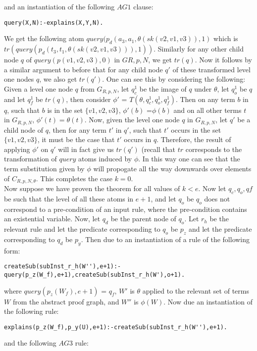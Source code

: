 \documentclass{article}
\begin{document}
and an instantiation of the following $AG1$ clause:
\begin{verbatim}
query(X,N):-explains(X,Y,N).    
\end{verbatim}
We get the following atom $query(p_{d}(a_{3},a_{1},\theta(sk(v2,v1,v3)),1)$ which is $tr(query(p_{d}(t_{3},t_{1},\theta(sk(v2,v1,v3))),1))$. Similarly for any other child node $q$ of $query(p(v1,v2,v3),0)$ in $G{R,p,N}$, we get $tr(q)$. Now it follows by a similar argument to before that for any child node $q'$ of these transformed level one nodes $q$, we also get $tr(q')$. One can see this by considering the following: Given a level one node $q$ from $G_{R,p,N}$, let $q_{c}^{1}$ be the image of $q$ under $\theta$, let $q_{o}^{1}$ be $q$ and let $q_{f}^{1}$ be $tr(q)$, then consider $\phi'$ = $T(\theta, q_{c}^{1},q_{o}^{1},q_{f}^{1})$. Then on any term $b$ in $q$, such that $b$ is in the set $\{v1,v2,v3\}$, $\phi'(b)$ =$\phi(b)$ and on all other terms $t$ in $G_{R,p,N}$, $\phi'(t)=\theta(t)$. Now, given the level one node $q$ in $G_{R,p,N}$, let $q'$ be a child node of $q$, then for any term $t'$ in $q'$, such that $t'$ occurs in the set $\{v1,v2,v3\}$, it must be the case that $t'$ occurs in $q$. Therefore, the result of applying $\phi'$ on $q'$ will in fact give us $tr(q')$ (recall that $tr$ corresponds to the transformation of $query$ atoms induced by $\phi$. In this way one can see that the term substitution given by $\phi$ will propogate all the way downwards over elements of $C_{R,p,N,\theta}$. This completes the case $k=0$. \\
\newline
Now suppose we have proven the theorem for all values of $k<e$. Now let $q_{c},q_{o},q{f}$ be such that the level of all these atoms in $e+1$, and let $q_{o}$ be $q_{o}$ does not correspond to a pre-condition of an input rule, where the pre-condition contains an existential variable. Now, let $q_{d}$ be the parent node of $q_{o}$. Let $r_{h}$ be the relevant rule and let the predicate corresponding to $q_{o}$ be $p_{z}$ and let the predicate corresponding to $q_{d}$ be $p_{y}$. Then due to an instantiation of a rule of the following form:
\begin{verbatim}
createSub(subInst_r_h(W''),e+1):-query(p_z(W_f),e+1),createSub(subInst_r_h(W'),o+1).
\end{verbatim}
where $query(p_{z}(W_{f}),e+1)$ = $q_{f}$, $W'$ is $\theta$ applied to the relevant set of terms $W$ from the abstract proof graph, and $W''$ is $\phi(W)$. Now due an instantiation of the following rule:
\begin{verbatim}
explains(p_z(W_f),p_y(U),e+1):-createSub(subInst_r_h(W''),e+1).
\end{verbatim} and the following $AG3$ rule:
\end{document}
